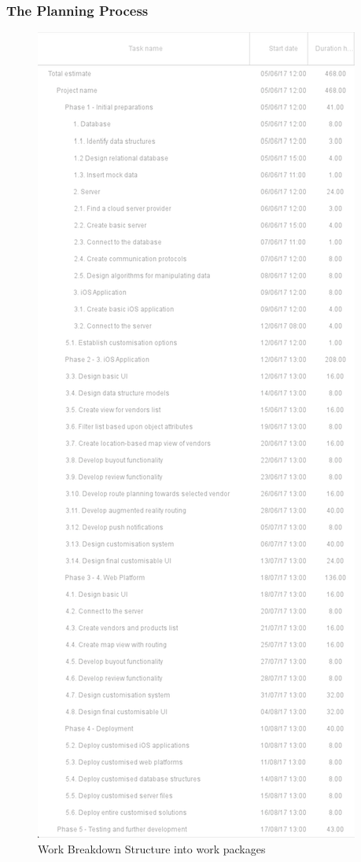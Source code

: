 
\subsubsection{The Planning Process}

\begin{figure}[!ht]
\centering
\includegraphics[scale=0.86]{img/WBS.png}
\caption{Work Breakdown Structure into work packages}
\label{fig:wbs}
\end{figure}

